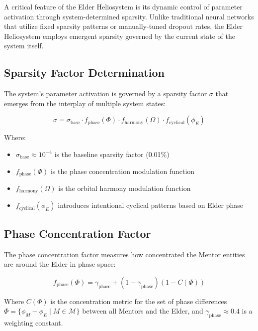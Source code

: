 A critical feature of the Elder Heliosystem is its dynamic control of parameter activation through system-determined sparsity. Unlike traditional neural networks that utilize fixed sparsity patterns or manually-tuned dropout rates, the Elder Heliosystem employs emergent sparsity governed by the current state of the system itself.

\subsection{Sparsity Factor Determination}

The system's parameter activation is governed by a sparsity factor $\sigma$ that emerges from the interplay of multiple system states:

\begin{equation}
\sigma = \sigma_{\text{base}} \cdot f_{\text{phase}}(\Phi) \cdot f_{\text{harmony}}(\Omega) \cdot f_{\text{cyclical}}(\phi_E)
\end{equation}

Where:
\begin{itemize}
    \item $\sigma_{\text{base}} \approx 10^{-4}$ is the baseline sparsity factor (0.01\%)
    \item $f_{\text{phase}}(\Phi)$ is the phase concentration modulation function
    \item $f_{\text{harmony}}(\Omega)$ is the orbital harmony modulation function
    \item $f_{\text{cyclical}}(\phi_E)$ introduces intentional cyclical patterns based on Elder phase
\end{itemize}

\subsection{Phase Concentration Factor}

The phase concentration factor measures how concentrated the Mentor entities are around the Elder in phase space:

\begin{equation}
f_{\text{phase}}(\Phi) = \gamma_{\text{phase}} + (1 - \gamma_{\text{phase}})(1 - C(\Phi))
\end{equation}

Where $C(\Phi)$ is the concentration metric for the set of phase differences $\Phi = \{\phi_M - \phi_E \mid M \in \mathcal{M}\}$ between all Mentors and the Elder, and $\gamma_{\text{phase}} \approx 0.4$ is a weighting constant.


